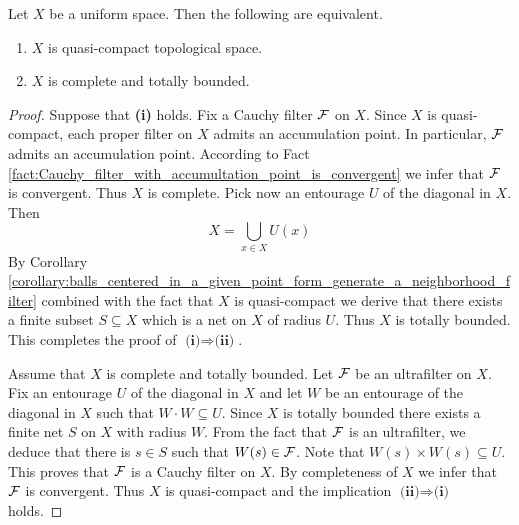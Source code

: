 \documentclass[10pt]{amsart}
\begin{document}
\begin{theorem}\label{theorem:quasi_compact_uniform_spaces_are_equivalent_to_complete_and_totally_bounded}
	Let $X$ be a uniform space. Then the following are equivalent.
	\begin{enumerate}[label=\emph{\textbf{(\roman*)}}, leftmargin=3.0em]
		\item $X$ is quasi-compact topological space.
		\item $X$ is complete and totally bounded.
	\end{enumerate}
\end{theorem}
\begin{proof}
	Suppose that \textbf{(i)} holds. Fix a Cauchy filter ${\mathcal F}$ on $X$. Since $X$ is quasi-compact, each proper filter on $X$ admits an accumulation point. In particular, ${\mathcal F}$ admits an accumulation point. According to Fact \ref{fact:Cauchy_filter_with_accumultation_point_is_convergent} we infer that ${\mathcal F}$ is convergent. Thus $X$ is complete. Pick now an entourage $U$ of the diagonal in $X$. Then
	$$X = \bigcup_{x\in X}U(x)$$
	By Corollary \ref{corollary:balls_centered_in_a_given_point_form_generate_a_neighborhood_filter} combined with the fact that $X$ is quasi-compact we derive that there exists a finite subset $S \subseteq X$ which is a net on $X$ of radius $U$. Thus $X$ is totally bounded. This completes the proof of $\textbf{(i)}\Rightarrow \textbf{(ii)}$.

	Assume that $X$ is complete and totally bounded. Let ${\mathcal F}$ be an ultrafilter on $X$. Fix an entourage $U$ of the diagonal in $X$ and let $W$ be an entourage of the diagonal in $X$ such that $W\cdot W \subseteq U$. Since $X$ is totally bounded there exists a finite net $S$ on $X$ with radius $W$. From the fact that ${\mathcal F}$ is an ultrafilter, we deduce that there is $s \in S$ such that $W(s) \in {\mathcal F}$. Note that $W(s)\times W(s) \subseteq U$. This proves that ${\mathcal F}$ is a Cauchy filter on $X$. By completeness of $X$ we infer that ${\mathcal F}$ is convergent. Thus $X$ is quasi-compact and the implication $\textbf{(ii)}\Rightarrow \textbf{(i)}$ holds.
\end{proof}




























\small


\end{document}
